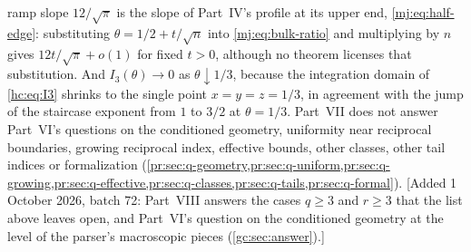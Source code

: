 \documentclass[11pt,a4paper]{article}
\theoremstyle{definition}\newaliascnt{definition}{theorem}
\theoremstyle{remark}\newaliascnt{remark}{theorem}
\begin{document}
ramp slope $12/\sqrt\pi$ is the slope of Part~IV's profile at its upper end,
\eqref{mj:eq:half-edge}: substituting $\theta=1/2+t/\sqrt n$ into
\eqref{mj:eq:bulk-ratio} and multiplying by $n$ gives $12t/\sqrt\pi+o(1)$
for fixed $t>0$, although no theorem licenses that substitution. And
$I_3(\theta)\to0$ as $\theta\downarrow1/3$, because the integration domain
of \eqref{hc:eq:I3} shrinks to the single point $x=y=z=1/3$, in agreement
with the jump of the staircase exponent from $1$ to $3/2$ at $\theta=1/3$.
Part~VII does not answer Part~VI's questions on the conditioned geometry,
uniformity near reciprocal boundaries, growing reciprocal index, effective
bounds, other classes, other tail indices or formalization
(\cref{pr:sec:q-geometry,pr:sec:q-uniform,pr:sec:q-growing,pr:sec:q-effective,pr:sec:q-classes,pr:sec:q-tails,pr:sec:q-formal}).
[Added 1 October 2026, batch 72: Part~VIII answers the cases $q\ge3$ and
$r\ge3$ that the list above leaves open, and Part~VI's question on the
conditioned geometry at the level of the parser's macroscopic pieces
(\cref{gc:sec:answer}).]
\end{document}
